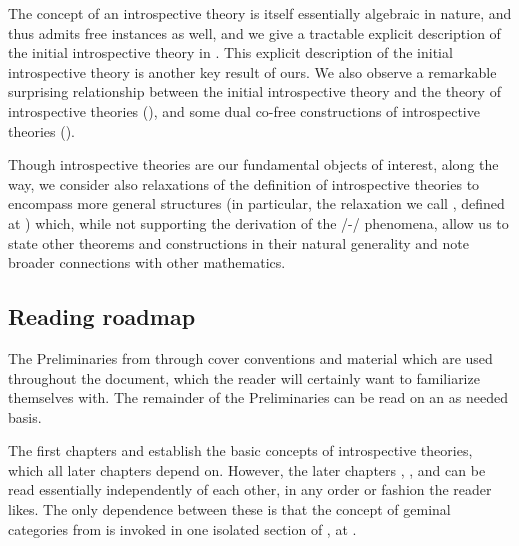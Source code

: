 The concept of an introspective theory is itself essentially algebraic in nature, and thus admits free instances as well, and we give a tractable explicit description of the initial introspective theory in . This explicit description of the initial introspective theory is another key result of ours. We also observe a remarkable surprising relationship between the initial introspective theory and the theory of introspective theories (), and some dual co-free constructions of introspective theories ().

Though introspective theories are our fundamental objects of interest, along the way, we consider also relaxations of the definition of introspective theories to encompass more general structures (in particular, the relaxation we call , defined at ) which, while not supporting the derivation of the \Godel/-\Lob/ phenomena, allow us to state other theorems and constructions in their natural generality and note broader connections with other mathematics.


\subsection{Reading roadmap}
The Preliminaries from  through  cover conventions and material which are used throughout the document, which the reader will certainly want to familiarize themselves with. The remainder of the Preliminaries can be read on an as needed basis.

The first chapters  and  establish the basic concepts of introspective theories, which all later chapters depend on. However, the later chapters , , and  can be read essentially independently of each other, in any order or fashion the reader likes. The only dependence between these is that the concept of geminal categories from  is invoked in one isolated section of , at .

\fileend